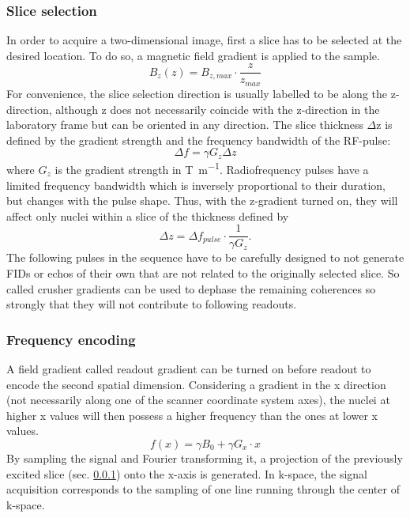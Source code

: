         \subsubsection{Slice selection}
        \label{sec:theory:sliceSelection}
        In order to acquire a two-dimensional image, first a slice has to be selected at the desired location. To do so, a magnetic field gradient is applied to the sample. 
            \begin{equation}
                B_z(z) = B_{z,max} \cdot \frac{z}{z_{max}}
            \end{equation}
            For convenience, the slice selection direction is usually labelled to be along the z-direction, although z does not necessarily coincide with the z-direction in the laboratory frame but can be oriented in any direction.
            The slice thickness $\Delta$z is defined by the gradient strength and the frequency bandwidth of the RF-pulse:
            \begin{equation}
                \Delta f = \gamma G_z \Delta z
            \end{equation}
            where $G_z$ is the gradient strength in \si{\tesla\per\meter}.
            Radiofrequency pulses have a limited frequency bandwidth which is inversely proportional to their duration, but changes with the pulse shape. Thus, with the z-gradient turned on, they will affect only nuclei within a slice of the thickness defined by
            \begin{equation}
                \Delta z = \Delta f_{pulse} \cdot \frac{1}{\gamma G_z}.
            \end{equation}
             The following pulses in the sequence have to be carefully designed to not generate FIDs or echos of their own that are not related to the originally selected slice. So called crusher gradients can be used to dephase the remaining coherences so strongly that they will not contribute to following readouts.
        \subsubsection{Frequency encoding}
        A field gradient called readout gradient can be turned on before readout to encode the second spatial dimension. Considering a gradient in the x direction (not necessarily along one of the scanner coordinate system axes), the nuclei at higher x values will then possess a higher frequency than the ones at lower x values.
            \begin{equation}
                f(x) = \gamma B_0 + \gamma G_x \cdot x
            \end{equation}
              By sampling the signal and Fourier transforming it, a projection of the previously excited slice (sec. \ref{sec:theory:sliceSelection}) onto the x-axis is generated. In k-space, the signal acquisition corresponds to the sampling of one line running through the center of k-space.
